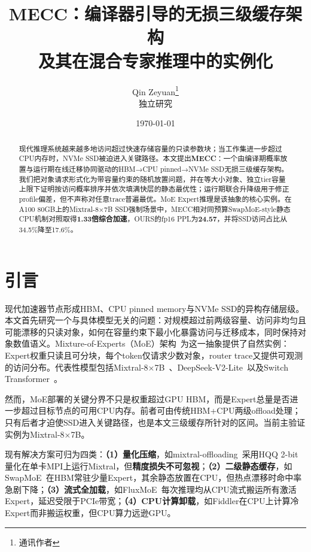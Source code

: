 \documentclass[11pt,a4paper]{article}
\title{\textbf{MECC：编译器引导的无损三级缓存架构\\及其在混合专家推理中的实例化}}
\author{
    Qin Zeyuan\thanks{通讯作者} \\
    \small 独立研究
}
\date{\today}
\begin{document}
\maketitle

\begin{abstract}
现代推理系统越来越多地访问超过快速存储容量的只读参数块；当工作集进一步超过CPU内存时，NVMe SSD被迫进入关键路径。本文提出\textbf{MECC}：一个由编译期概率放置与运行期在线迁移协同驱动的HBM→CPU pinned→NVMe SSD无损三级缓存架构。我们把对象请求形式化为带容量约束的随机放置问题，并在等大小对象、独立tier容量上限下证明按访问概率排序并依次填满快层的静态最优性；运行期联合升降级用于修正profile偏差，但不声称对任意trace普遍最优。MoE Expert推理是该抽象的核心实例。在A100 80GB上的Mixtral-8×7B SSD强制场景中，MECC相对同预算SwapMoE-style静态CPU机制对照取得\textbf{1.33倍综合加速}，OURS的fp16 PPL为\textbf{24.57}，并将SSD访问占比从34.5\%降至17.6\%。
\end{abstract}

\section{引言}

现代加速器节点形成HBM、CPU pinned memory与NVMe SSD的异构存储层级。本文首先研究一个与具体模型无关的问题：对规模超过前两级容量、访问非均匀且可能漂移的只读对象，如何在容量约束下最小化暴露访问与迁移成本，同时保持对象数值语义。Mixture-of-Experts（MoE）架构~\cite{shazeer2017outrageously}为这一抽象提供了自然实例：Expert权重只读且可分块，每个token仅请求少数对象，router trace又提供可观测的访问分布。代表性模型包括Mixtral-8×7B~\cite{jiang2024mixtral}、DeepSeek-V2-Lite~\cite{deepseek2024v2}以及Switch Transformer~\cite{fedus2022switch}。

然而，MoE部署的关键分界不只是权重超过GPU HBM，而是Expert总量是否进一步超过目标节点的可用CPU内存。前者可由传统HBM+CPU两级offload处理；只有后者才迫使SSD进入关键路径，也是本文三级缓存所针对的区间。当前主验证实例为Mixtral-8×7B。

现有解决方案可归为四类：\textbf{（1）量化压缩}，如mixtral-offloading~\cite{mixtral_offloading}采用HQQ 2-bit量化在单卡MPI上运行Mixtral，但\textbf{精度损失不可忽视}；\textbf{（2）二级静态缓存}，如SwapMoE~\cite{swapmoe2024}在HBM常驻少量Expert，其余静态放置在CPU，但热点漂移时命中率急剧下降；\textbf{（3）流式全加载}，如FluxMoE~\cite{fluxmoe2026}每次推理均从CPU流式搬运所有激活Expert，延迟受限于PCIe带宽；\textbf{（4）CPU计算卸载}，如Fiddler在CPU上计算冷Expert而非搬运权重，但CPU算力远逊GPU。
\end{document}
